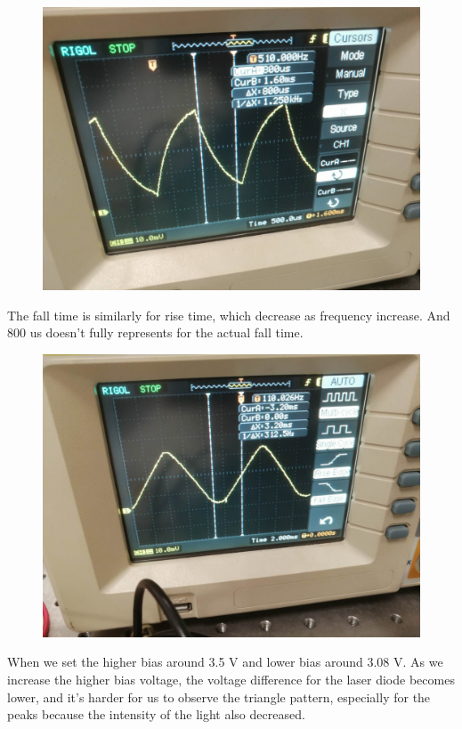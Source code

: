\documentclass[12pt]{article}
\begin{document}
\begin{figure}[H]
\centering
\includegraphics[scale=0.2]{Q2P5.jpg}
\end{figure}
The fall time is similarly for rise time, which decrease as frequency increase. And 800 us doesn't fully represents for the actual fall time.
\begin{figure}[H]
\centering
\includegraphics[scale=0.2]{Q2P6.jpg}
\end{figure}
When we set the higher bias around 3.5 V and lower bias around 3.08 V. As we increase the higher bias voltage, the voltage difference for the laser diode becomes lower, and it's harder for us to observe the triangle pattern, especially for the peaks because the intensity of the light also decreased.
\end{document}
